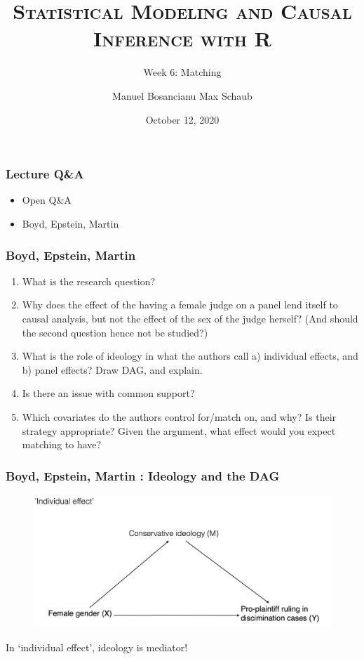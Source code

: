 \documentclass[12pt,english,dvipsnames,aspectratio=169,handout]{beamer}\usepackage[]{graphicx}\usepackage[]{xcolor}
\title{\textsc{Statistical Modeling and Causal Inference with R}}
\subtitle{Week 6: Matching}
\date{October 12, 2020}
\author{Manuel Bosancianu \hfill Max Schaub}
\institute{Hertie School of Governance}
\begin{document}
\maketitle


\begin{frame}
	\frametitle{Lecture Q\&A}
	\begin{itemize} \large
		\item Open Q\&A 
		\item Boyd, Epstein, Martin \citeyear{boyd_untangling_2010}
	\end{itemize}
\end{frame}


\begin{frame}
	\frametitle{Boyd, Epstein, Martin \citeyear{boyd_untangling_2010}}
	\footnotesize
	\begin{enumerate}
		\item What is the research question?
		\item Why does the effect of the having a female judge on a panel lend itself to causal analysis, but not the effect of the sex of the judge herself? (And should the second question hence not be studied?)
		\item What is the role of ideology in what the authors call a) individual effects, and b) panel effects? Draw DAG, and explain.
		\item Is there an issue with common support?
		\item Which covariates do the authors control for/match on, and why? Is their strategy appropriate? Given the argument, what effect would you expect matching to have? 
	\end{enumerate}
\end{frame}


\begin{frame}
	\frametitle{Boyd, Epstein, Martin \citeyear{boyd_untangling_2010}: Ideology and the DAG}
	\footnotesize
  	 \begin{figure} 
    \includegraphics[height=.65\textheight,keepaspectratio=true]{../04-figures/06/03-w6_dag_ind}
    \end{figure}
    In `individual effect', ideology is mediator!
\end{frame}
\end{document}
